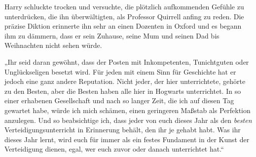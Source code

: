 Harry schluckte trocken und versuchte, die plötzlich aufkommenden Gefühle zu unterdrücken, die ihn überwältigten, als Professor Quirrell anfing zu reden. Die präzise Diktion erinnerte ihn sehr an einen Dozenten in Oxford und es begann ihm zu dämmern, dass er sein Zuhause, seine Mum und seinen Dad bis Weihnachten nicht sehen würde.

„Ihr seid daran gewöhnt, dass der Posten mit Inkompetenten, Tunichtguten oder Unglückseligen besetzt wird. Für jeden mit einem Sinn für Geschichte hat er jedoch eine ganz andere Reputation. Nicht jeder, der hier unterrichtete, gehörte zu den Besten, aber die Besten haben alle hier in Hogwarts unterrichtet. In so einer erhabenen Gesellschaft und nach so langer Zeit, die ich auf diesen Tag gewartet habe, würde ich mich schämen, einen geringeren Maßstab als Perfektion anzulegen. Und so beabsichtige ich, dass jeder von euch dieses Jahr als den \emph{besten} Verteidigungsunterricht in Erinnerung behält, den ihr je gehabt habt. Was ihr dieses Jahr lernt, wird euch für immer als ein festes Fundament in der Kunst der Verteidigung dienen, egal, wer euch zuvor oder danach unterrichtet hat.“

